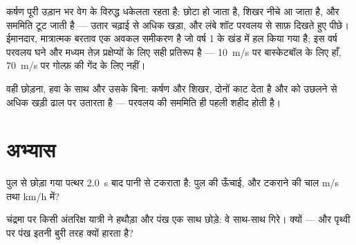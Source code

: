 \begin{remark}[असली प्रक्षेप्य-विद्या]\label{rem:g12:projectile-motion:drag}
कर्षण पूरी उड़ान भर वेग के विरुद्ध धकेलता रहता है:  छोटा हो जाता
है, शिखर नीचे आ जाता है, और सममिति टूट जाती है --- उतार चढ़ाई से अधिक खड़ा, और
लंबे शॉट परवलय से साफ़ दिखते हुए पीछे। ईमानदार, मात्रात्मक बरताव एक अवकल समीकरण
है जो वर्ष 1 के खंड में हल किया गया है; इस वर्ष परवलय घने और मध्यम तेज़
प्रक्षेप्यों के लिए सही प्रतिरूप है --- \qty{10}{m/s} पर बास्केटबॉल के लिए
हाँ, \qty{70}{m/s} पर गोल्फ़ की गेंद के लिए नहीं।
\end{remark}

\begin{omfigure}

{\small वही छोड़ना, हवा के साथ और उसके बिना: कर्षण  और शिखर,
दोनों काट देता है और  को उछलने से अधिक खड़ी ढाल पर उतारता
है --- परवलय की सममिति ही पहली शहीद होती है।}
\end{omfigure}

\section{अभ्यास}

\begin{exercise}[$\star$]\label{exo:g12:projectile-motion:1}
पुल से छोड़ा गया पत्थर \qty{2.0}{s} बाद पानी से टकराता है: पुल की ऊँचाई, और टकराने
की चाल \unit{m/s} तथा \unit{km/h} में?
\end{exercise}

\begin{exercise}[$\star$]\label{exo:g12:projectile-motion:2}
चंद्रमा पर किसी अंतरिक्ष यात्री ने हथौड़ा और पंख एक साथ छोड़े: वे साथ-साथ गिरे।
क्यों --- और पृथ्वी पर पंख इतनी बुरी तरह क्यों हारता है?
\end{exercise}

